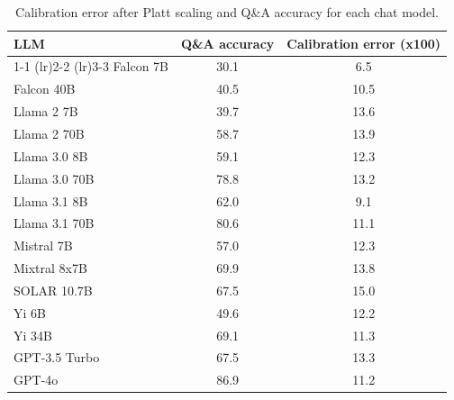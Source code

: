 \begin{table}[h]
\caption{Calibration error after Platt scaling and Q\&A accuracy for each chat model.}
\label{tab:calibration_platt}
\centering
\begin{tabular}{lcc}
\toprule
LLM & Q\&A accuracy & Calibration error (x100) \\ 
\cmidrule(lr){1-1} \cmidrule(lr){2-2} \cmidrule(lr){3-3}
Falcon 7B & 30.1 & 6.5\\
Falcon 40B & 40.5 & 10.5\\
Llama 2 7B & 39.7 & 13.6\\
Llama 2 70B & 58.7 & 13.9\\
Llama 3.0 8B & 59.1 & 12.3\\
Llama 3.0 70B & 78.8 & 13.2\\
Llama 3.1 8B & 62.0 & 9.1\\
Llama 3.1 70B & 80.6 & 11.1\\
Mistral 7B & 57.0 & 12.3\\
Mixtral 8x7B & 69.9 & 13.8\\
SOLAR 10.7B & 67.5 & 15.0\\
Yi 6B & 49.6 & 12.2\\
Yi 34B & 69.1 & 11.3\\
GPT-3.5 Turbo & 67.5 & 13.3\\
GPT-4o & 86.9 & 11.2\\
\bottomrule
\end{tabular}
\end{table}
